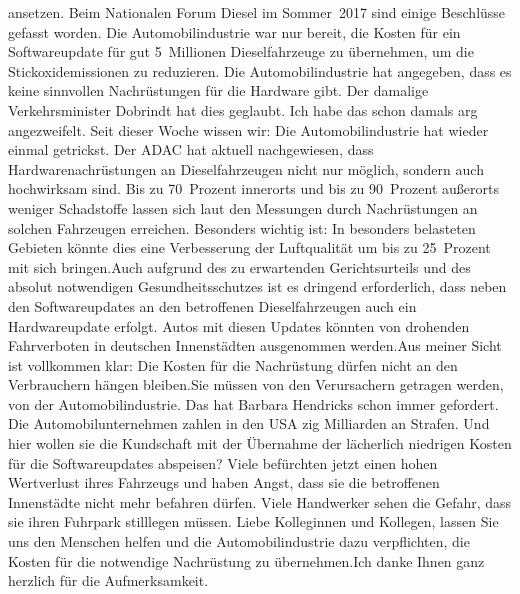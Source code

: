 \documentclass{article}
\begin{document}
ansetzen. Beim Nationalen Forum Diesel im Sommer 2017 sind einige Beschlüsse gefasst worden. Die Automobilindustrie war nur bereit, die Kosten für ein Softwareupdate für gut 5 Millionen Dieselfahrzeuge zu übernehmen, um die Stickoxidemissionen zu reduzieren. Die Automobilindustrie hat angegeben, dass es keine sinnvollen Nachrüstungen für die Hardware gibt. Der damalige Verkehrsminister Dobrindt hat dies geglaubt. Ich habe das schon damals arg angezweifelt. Seit dieser Woche wissen wir: Die Automobilindustrie hat wieder einmal getrickst. Der ADAC hat aktuell nachgewiesen, dass Hardwarenachrüstungen an Dieselfahrzeugen nicht nur möglich, sondern auch hochwirksam sind. Bis zu 70 Prozent innerorts und bis zu 90 Prozent außerorts weniger Schadstoffe lassen sich laut den Messungen durch Nachrüstungen an solchen Fahrzeugen erreichen. Besonders wichtig ist: In besonders belasteten Gebieten könnte dies eine Verbesserung der Luftqualität um bis zu 25 Prozent mit sich bringen.Auch aufgrund des zu erwartenden Gerichtsurteils und des absolut notwendigen Gesundheitsschutzes ist es dringend erforderlich, dass neben den Softwareupdates an den betroffenen Dieselfahrzeugen auch ein Hardwareupdate erfolgt. Autos mit diesen Updates könnten von drohenden Fahrverboten in deutschen Innenstädten ausgenommen werden.Aus meiner Sicht ist vollkommen klar: Die Kosten für die Nachrüstung dürfen nicht an den Verbrauchern hängen bleiben.Sie müssen von den Verursachern getragen werden, von der Automobilindustrie. Das hat Barbara Hendricks schon immer gefordert. Die Automobilunternehmen zahlen in den USA zig Milliarden an Strafen. Und hier wollen sie die Kundschaft mit der Übernahme der lächerlich niedrigen Kosten für die Softwareupdates abspeisen? Viele befürchten jetzt einen hohen Wertverlust ihres Fahrzeugs und haben Angst, dass sie die betroffenen Innenstädte nicht mehr befahren dürfen. Viele Handwerker sehen die Gefahr, dass sie ihren Fuhrpark stilllegen müssen. Liebe Kolleginnen und Kollegen, lassen Sie uns den Menschen helfen und die Automobilindustrie dazu verpflichten, die Kosten für die notwendige Nachrüstung zu übernehmen.Ich danke Ihnen ganz herzlich für die Aufmerksamkeit.
\end{document}
